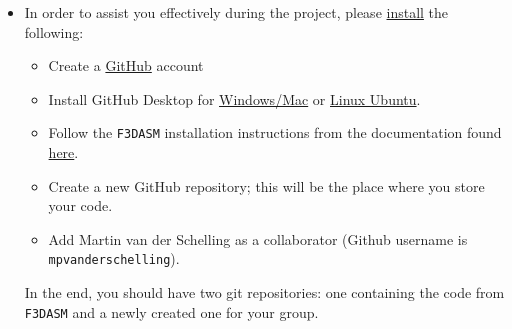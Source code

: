 \documentclass[10pt,a4paper,twoside]{article} %
\def\code#1{\texttt{#1}}
\begin{document}
\begin{itemize}
\setcounter{enumi}{1}
	\item In order to assist you effectively during the project, please \underline{install} the following:
	
	\begin{itemize}
		
		\item Create a \href{https://github.com/}{GitHub} account
		
		\item Install GitHub Desktop for \href{https://desktop.github.com/}{Windows/Mac} or \href{https://linuxhint.com/install-and-use-github-desktop-on-ubuntu/}{Linux Ubuntu}.
		
		\item Follow the \code{F3DASM} installation instructions from the documentation found \href{https://bessagroup.github.io/F3DASM/gettingstarted.html}{here}.
		
		\item Create a new GitHub repository; this will be the place where you store your code.
		
		\item Add Martin van der Schelling as a collaborator (Github username is \code{mpvanderschelling}).
		
	\end{itemize}
	
	In the end, you should have two git repositories: one containing the code from \code{F3DASM} and a newly created one for your group.
	
\end{itemize}
\end{document}
